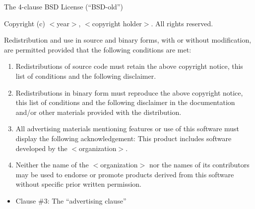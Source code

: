 \begin{frame}

\begin{block}{The 4-clause BSD License (``BSD-old'')} 

\footnotesize
  
Copyright (c) $<$year$>$, $<$copyright holder$>$. All rights reserved.

Redistribution and use in source and binary forms, with or without
modification, are permitted provided that the following conditions are met:
\begin{enumerate}
\item Redistributions of source code must retain the above copyright
   notice, this list of conditions and the following disclaimer.
\item Redistributions in binary form must reproduce the above copyright
   notice, this list of conditions and the following disclaimer in the
   documentation and/or other materials provided with the distribution.
\item \alert{All advertising materials mentioning features or use of this software
   must display the following acknowledgement:
   This product includes software developed by the $<$organization$>$.}
\item Neither the name of the $<$organization$>$ nor the
   names of its contributors may be used to endorse or promote products
   derived from this software without specific prior written permission.
\end{enumerate}

\end{block}

\begin{itemize}
  \item Clause \#3: \alert{The ``advertising clause''}
\end{itemize}

\end{frame}


